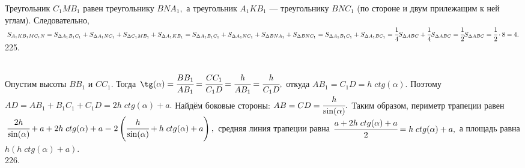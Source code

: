 \documentclass[12pt]{article}
\begin{document}
Треугольник $C_1MB_1$ равен треугольнику $BNA_1,$ а треугольник $A_1KB_1$ --- треугольнику $BNC_1$ (по стороне и двум прилежащим к ней углам). Следовательно,
$S_{A_1KB_1MC_1N} = S_{\Delta A_1B_1C_1} + S_{\Delta A_1NC_1} + S_{\Delta C_1MB_1} + S_{\Delta A_1KB_1}
= S_{\Delta A_1B_1C_1} + S_{\Delta A_1NC_1} + S_{\Delta BNA_1} + S_{\Delta BNC_1}
= S_{\Delta A_1B_1C_1} + S_{\Delta A_1BC_1} = \cfrac{1}{4}S_{\Delta ABC} + \cfrac{1}{4}S_{\Delta ABC} = \cfrac{1}{2}S_{\Delta ABC}=\cfrac{1}{2}\cdot 8=4.$\\
225. \begin{figure}[ht!]
\end{figure}\\
Опустим высоты $BB_1$ и $CC_1.$ Тогда $\tg(\alpha)=\cfrac{BB_1}{AB_1}=\cfrac{CC_1}{C_1D}=\cfrac{h}{AB_1}=\cfrac{h}{C_1D},$ откуда $AB_1=C_1D=h\; ctg(\alpha).$ Поэтому $AD=AB_1+B_1C_1+C_1D=2h\; ctg(\alpha)+a.$ Найдём боковые стороны: $AB=CD=\cfrac{h}{\sin(\alpha)}.$ Таким образом, периметр трапеции равен $\cfrac{2h}{\sin(\alpha)}+a+2h\; ctg(\alpha)+a=2\left(\cfrac{h}{\sin(\alpha)}+h\; ctg(\alpha)+a\right),$ средняя линия трапеции равна $\cfrac{a+2h\; ctg(\alpha)+a}{2}=h\; ctg(\alpha)+a,$ а площадь равна $h(h\; ctg(\alpha)+a).$\\
226. \begin{figure}[ht!]
\end{figure}\\
\end{document}
